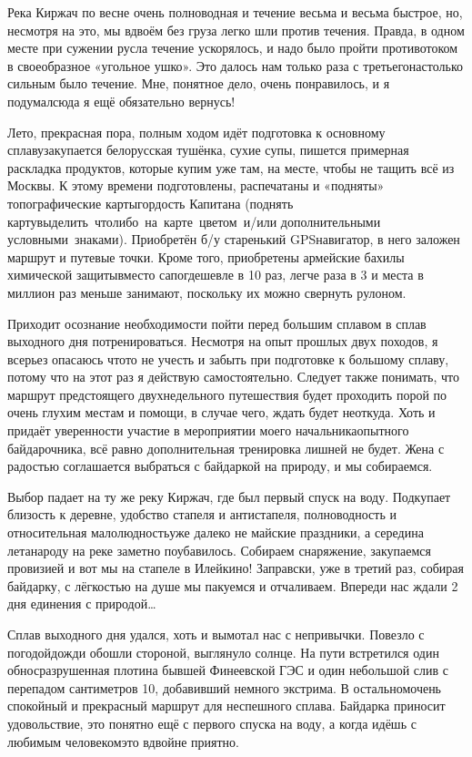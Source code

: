 Река Киржач по весне очень полноводная и течение весьма и весьма быстрое, но, несмотря на это, мы вдвоём без груза легко шли против течения. Правда, в одном месте при сужении русла течение ускорялось, и надо было пройти противотоком в своеобразное «угольное ушко». Это далось нам только раза с третьего\mdash настолько сильным было течение. Мне, понятное дело, очень понравилось, и я подумал\mdash сюда я ещё обязательно вернусь! 

Лето, прекрасная пора, полным ходом идёт подготовка к основному сплаву\mdash закупается белорусская тушёнка, сухие супы, пишется примерная раскладка продуктов, которые купим уже там, на месте, чтобы не тащить всё из Москвы. К этому времени подготовлены, распечатаны и «подняты» топографические карты\mdash гордость Капитана (поднять карту\mdash выделить что\sdash либо на карте цветом и/или дополнительными условными знаками). Приобретён б/у старенький GPS\sdash навигатор, в него заложен маршрут и путевые точки. Кроме того, приобретены армейские бахилы химической защиты\mdash вместо сапог\mdash дешевле в 10 раз, легче раза в 3 и места в миллион раз меньше занимают, поскольку их можно свернуть рулоном. 

Приходит осознание необходимости пойти перед большим сплавом в сплав выходного дня потренироваться. Несмотря на опыт прошлых двух походов, я всерьез опасаюсь что\sdash то не учесть и забыть при подготовке к большому сплаву, потому что на этот раз я действую самостоятельно. Следует также понимать, что маршрут предстоящего двухнедельного путешествия будет проходить порой по очень глухим местам и помощи, в случае чего, ждать будет неоткуда. Хоть и придаёт уверенности участие в мероприятии моего начальника\mdash опытного байдарочника, всё равно дополнительная тренировка лишней не будет. Жена с радостью соглашается выбраться с байдаркой на природу, и мы собираемся.

Выбор падает на ту же реку Киржач, где был первый спуск на воду. Подкупает близость к деревне, удобство стапеля и антистапеля, полноводность и относительная малолюдность\mdash уже далеко не майские праздники, а середина лета\mdash народу на реке заметно поубавилось. Собираем снаряжение, закупаемся провизией и вот мы на стапеле в Илейкино! Заправски, уже в третий раз, собирая байдарку, с лёгкостью на душе мы пакуемся и отчаливаем. Впереди нас ждали 2 дня единения с природой\ldots

Сплав выходного дня удался, хоть и вымотал нас с непривычки. Повезло с погодой\mdash дожди обошли стороной, выглянуло солнце. На пути встретился один обнос\mdash разрушенная плотина бывшей Финеевской ГЭС и один небольшой слив с перепадом сантиметров 10, добавивший немного экстрима. В остальном\mdash очень спокойный и прекрасный маршрут для неспешного сплава. Байдарка приносит удовольствие, это понятно ещё с первого спуска на воду, а когда идёшь с любимым человеком\mdash это вдвойне приятно.


